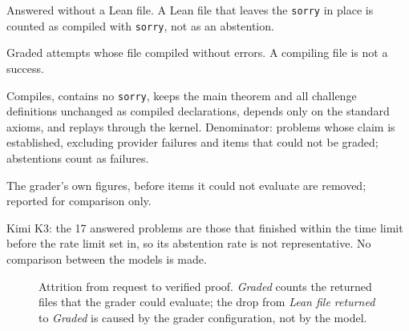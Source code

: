 \documentclass[11pt]{article}
\begin{document}
\begin{table}[!htbp]
\begin{threeparttable}
\begin{tablenotes}
\item[b] Answered without a Lean file. A Lean file that leaves the \texttt{sorry} in place is counted as compiled with \texttt{sorry}, not as an abstention.
\item[c] Graded attempts whose file compiled without errors. A compiling file is not a success.
\item[d] Compiles, contains no \texttt{sorry}, keeps the main theorem and all challenge definitions unchanged as compiled declarations, depends only on the standard axioms, and replays through the kernel. Denominator: problems whose claim is established, excluding provider failures and items that could not be graded; abstentions count as failures.
\item[e] The grader's own figures, before items it could not evaluate are removed; reported for comparison only.
\item[] Kimi K3: the 17 answered problems are those that finished within the time limit before the rate limit set in, so its abstention rate is not representative. No comparison between the models is made.
\end{tablenotes}
\end{threeparttable}
\end{table}

\begin{figure}[!htbp]
\centering
{}
\caption{Attrition from request to verified proof. \emph{Graded} counts the returned files that the grader could evaluate; the drop from \emph{Lean file returned} to \emph{Graded} is caused by the grader configuration, not by the model.}
\label{fig:funnel}
\end{figure}
\end{document}
